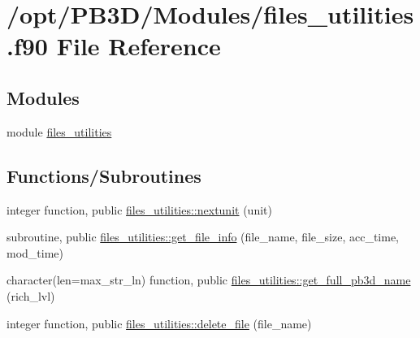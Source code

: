 \hypertarget{files__utilities_8f90}{}\section{/opt/\+P\+B3\+D/\+Modules/files\+\_\+utilities.f90 File Reference}
\label{files__utilities_8f90}
\subsection*{Modules}
\begin{DoxyCompactItemize}
\item 
module \hyperlink{namespacefiles__utilities}{files\+\_\+utilities}
\end{DoxyCompactItemize}
\subsection*{Functions/\+Subroutines}
\begin{DoxyCompactItemize}
\item 
integer function, public \hyperlink{namespacefiles__utilities_ac6066df405564ba2f5e3c4bba726c1f8}{files\+\_\+utilities\+::nextunit} (unit)
\item 
subroutine, public \hyperlink{namespacefiles__utilities_a07f2e430ff33c1e291731ad64c1fe482}{files\+\_\+utilities\+::get\+\_\+file\+\_\+info} (file\+\_\+name, file\+\_\+size, acc\+\_\+time, mod\+\_\+time)
\item 
character(len=max\+\_\+str\+\_\+ln) function, public \hyperlink{namespacefiles__utilities_a43f1c2b7e128b1b2cdbcdb8963daab0e}{files\+\_\+utilities\+::get\+\_\+full\+\_\+pb3d\+\_\+name} (rich\+\_\+lvl)
\item 
integer function, public \hyperlink{namespacefiles__utilities_a083c08dfd3919fa2a1df01507fe431af}{files\+\_\+utilities\+::delete\+\_\+file} (file\+\_\+name)
\end{DoxyCompactItemize}
